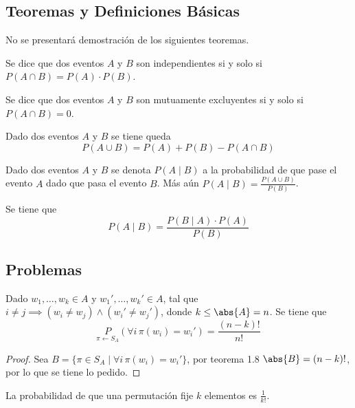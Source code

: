 \documentclass{ayudantia}
\begin{document}
\subsection{Teoremas y Definiciones Básicas}
No se presentará demostración de los siguientes teoremas.
\begin{defn}
    Se dice que dos eventos \(A\) y \(B\) son independientes si y solo si \(P(A\cap B)=P(A)\cdot P(B)\).
\end{defn}
\begin{defn}
    Se dice que dos eventos \(A\) y \(B\) son mutuamente excluyentes si y solo si \(P(A\cap B)=0\).
\end{defn}
\begin{thm}
    Dado dos eventos \(A\) y \(B\) se tiene queda
    \begin{equation*}
        P(A\cup B)=P(A)+P(B)-P(A\cap B)
    \end{equation*}
\end{thm}
\begin{defn}
    Dado dos eventos \(A\) y \(B\) se denota \(P(A\mid B)\) a la probabilidad de que pase el evento \(A\) dado que pasa el evento \(B\). Más aún \(P(A\mid B)=\frac{P(A\cup B)}{P(B)}\).
\end{defn}
\begin{thm}[Bayes]
    Se tiene que
    \begin{equation*}
        P(A\mid B)=\frac{P(B\mid A)\cdot P(A)}{P(B)}
    \end{equation*}
\end{thm}
\subsection{Problemas}
\begin{thm}
    Dado \(w_1,\ldots,w_k\in A\) y \(w_1',\ldots,w_k'\in A\), tal que \(i\neq j\implies (w_i\neq w_j)\wedge (w_i'\neq w_j')\), donde \(k\leq\abs{A}=n\). Se tiene que
    \begin{equation*}
        \underset{\pi\leftarrow S_A}{P}(\forall i\, \pi(w_i)=w_i')=\frac{(n-k)!}{n!}
    \end{equation*}
\end{thm}
\begin{proof}
    Sea \(B=\{\pi\in S_A\mid \forall i\, \pi(w_i)=w_i'\}\), por teorema 1.8 \(\abs{B}=(n-k)!\), por lo que se tiene lo pedido.
\end{proof}
\begin{cor}
    La probabilidad de que una permutación fije \(k\) elementos es \(\frac1{k!}\).
\end{cor}
\end{document}

